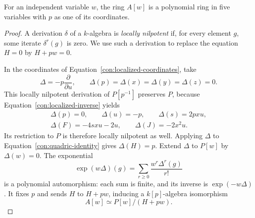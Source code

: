 \begin{proposition}\label{prop:stable}
For an independent variable $w$, the ring $A[w]$ is a polynomial ring in
five variables with $p$ as one of its coordinates.
\end{proposition}

\begin{proof}
A derivation $\delta$ of a $k$-algebra is \emph{locally nilpotent} if, for
every element $g$, some iterate $\delta^r(g)$ is zero.  We use such a derivation
to replace the equation $H=0$ by $H+pw=0$.

In the coordinates of Equation~\eqref{con:localized-coordinates}, take
\[
 \Delta=-p\frac{\partial}{\partial u},
 \qquad \Delta(p)=\Delta(x)=\Delta(y)=\Delta(z)=0.
\]
This locally nilpotent derivation of $P[p^{-1}]$ preserves $P$, because
Equation~\eqref{con:localized-inverse} yields
\begin{equation}\label{con:delta}
 \begin{gathered}
 \Delta(p)=0,\qquad \Delta(u)=-p,\qquad \Delta(s)=2pxu,\\
 \Delta(F)=-4sxu-2u,\qquad \Delta(J)=-2x^2u.
 \end{gathered}
\end{equation}
Its restriction to $P$ is therefore locally nilpotent as well.  Applying
$\Delta$ to Equation~\eqref{con:quadric-identity} gives $\Delta(H)=p$.
Extend $\Delta$ to $P[w]$ by $\Delta(w)=0$.  The exponential
\[
 \exp(w\Delta)(g)=\sum_{r\geq0}\frac{w^r\Delta^r(g)}{r!}
\]
is a polynomial automorphism: each sum is finite, and its inverse is
$\exp(-w\Delta)$.  It fixes $p$ and sends $H$ to $H+pw$, inducing a
$k[p]$-algebra isomorphism
\begin{equation}\label{con:stabilized-hypersurface}
 A[w]\simeq P[w]/(H+pw).
\end{equation}


\end{proof}
